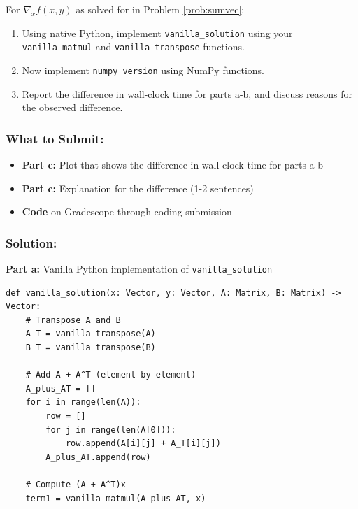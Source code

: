 \documentclass{article}
\begin{document}
\begin{aprob} \label{prob:sumvecimp}
    For $\nabla_x f(x,y)$ as solved for in Problem \ref{prob:sumvec}:
    \begin{enumerate}
        \item {} \sloppy Using native Python, implement \verb|vanilla_solution| using your \verb|vanilla_matmul| and \verb|vanilla_transpose| functions.
        \item {} Now implement \verb|numpy_version| using NumPy functions.
        \item {} Report the difference in wall-clock time for parts a-b, and discuss reasons for the observed difference.
    \end{enumerate}
    
    \subsubsection*{What to Submit:}
    \begin{itemize}
        \item \textbf{Part c:} Plot that shows the difference in wall-clock time for parts a-b
        \item \textbf{Part c:} Explanation for the difference (1-2 sentences)
        \item \textbf{Code} on Gradescope through coding submission
    \end{itemize}

    \subsubsection*{Solution:}

    \begin{mdframed}
    \textbf{\large Part a:} Vanilla Python implementation of \texttt{vanilla\_solution}
    \end{mdframed}

\begin{verbatim}
def vanilla_solution(x: Vector, y: Vector, A: Matrix, B: Matrix) -> Vector:
    # Transpose A and B
    A_T = vanilla_transpose(A)
    B_T = vanilla_transpose(B)

    # Add A + A^T (element-by-element)
    A_plus_AT = []
    for i in range(len(A)):
        row = []
        for j in range(len(A[0])):
            row.append(A[i][j] + A_T[i][j])
        A_plus_AT.append(row)

    # Compute (A + A^T)x
    term1 = vanilla_matmul(A_plus_AT, x)


\end{verbatim}
\end{aprob}
\end{document}

